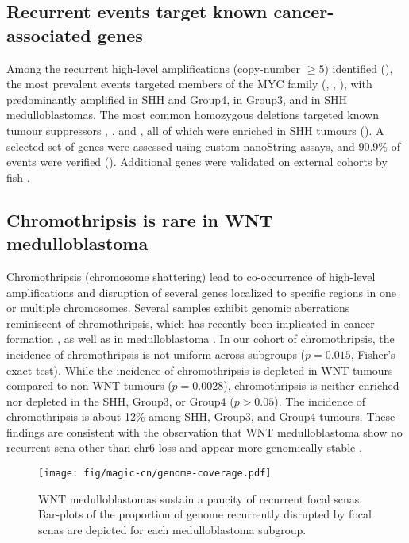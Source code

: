 \subsection{Recurrent events target known cancer-associated genes}

Among the recurrent high-level amplifications (copy-number $\geq 5$) identified (), the most prevalent events targeted members of the MYC family (, , ), with  predominantly amplified in SHH and Group4,  in Group3, and  in SHH medulloblastomas. The most common homozygous deletions targeted known tumour suppressors , , and , all of which were enriched in SHH tumours (). A selected set of genes were assessed using custom nanoString assays, and 90.9\% of events were verified (). Additional genes were validated on external cohorts by \gls{fish} .

\subsection{Chromothripsis is rare in WNT medulloblastoma}

Chromothripsis (chromosome shattering) lead to co-occurrence of high-level amplifications and disruption of several genes localized to specific regions in one or multiple chromosomes. Several samples exhibit genomic aberrations reminiscent of chromothripsis, which has recently been implicated in cancer formation , as well as in medulloblastoma . In our cohort of chromothripsis, the incidence of chromothripsis is not uniform across subgroups ($p = 0.015$, Fisher's exact test). While the incidence of chromothripsis is depleted in WNT tumours compared to non-WNT tumours ($p = 0.0028$), chromothripsis is neither enriched nor depleted in the SHH, Group3, or Group4 ($p > 0.05$). The incidence of chromothripsis is about 12\% among SHH, Group3, and Group4 tumours. These findings are consistent with the observation that WNT medulloblastoma show no recurrent \gls{scna} other than chr6 loss and appear more genomically stable .

\begin{SCfigure}[5]
	\centering
	\texttt{[image: fig/magic-cn/genome-coverage.pdf]}
	\caption[WNT medulloblastomas sustain a paucity of recurrent focal \gls{scnas}.]
	{
		WNT medulloblastomas sustain a paucity of recurrent focal \gls{scnas}.
		Bar-plots of the proportion of genome recurrently disrupted by focal \gls{scnas} are depicted for each medulloblastoma subgroup.
	}
	\label{fig:genome-coverage}
\end{SCfigure}

